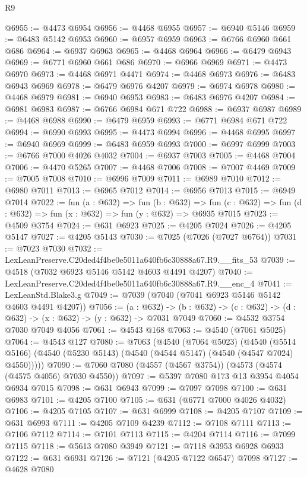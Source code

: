 \begin{lexlean}{R9}
\begin{coremodule}
@6955 := @4473 @6954
@6956 := @4468 @6955
@6957 := @6940 @5146
@6959 := @6483 @5142 @6953
@6960 := @6957 @6959
@6963 := @6766 @6960 @661 @686
@6964 := @6937 @6963
@6965 := @4468 @6964
@6966 := @6479 @6943
@6969 := @6771 @6960 @661 @686
@6970 := @6966 @6969
@6971 := @4473 @6970
@6973 := @4468 @6971 @4471
@6974 := @4468 @6973
@6976 := @6483 @6943 @6969
@6978 := @6479 @6976 @4207
@6979 := @6974 @6978
@6980 := @4468 @6979
@6981 := @6940 @6953
@6983 := @6483 @6976 @4207
@6984 := @6981 @6983
@6987 := @6766 @6984 @671 @722
@6988 := @6937 @6987
@6989 := @4468 @6988
@6990 := @6479 @6959
@6993 := @6771 @6984 @671 @722
@6994 := @6990 @6993
@6995 := @4473 @6994
@6996 := @4468 @6995
@6997 := @6940 @6969
@6999 := @6483 @6959 @6993
@7000 := @6997 @6999
@7003 := @6766 @7000 @4026 @4032
@7004 := @6937 @7003
@7005 := @4468 @7004
@7006 := @4470 @5265
@7007 := @4468 @7006
@7008 := @7007 @4469
@7009 := @7005 @7008
@7010 := @6996 @7009
@7011 := @6989 @7010
@7012 := @6980 @7011
@7013 := @6965 @7012
@7014 := @6956 @7013
@7015 := @6949 @7014
@7022 := fun (a : @632) =>
  fun (b : @632) =>
  fun (c : @632) => fun (d : @632) => fun (x : @632) => fun (y : @632) => @6935 @7015
@7023 := @4509 @3754
@7024 := @631 @6923
@7025 := @4205 @7024
@7026 := @4205 @5147
@7027 := @4205 @5143
@7030 := @7025 (@7026 (@7027 @6764))
@7031 := @7023 @7030
@7032 := LexLeanPreserve.C20ded4f4be0e5011a640fb6c30888a67.R9.__fits_53
@7039 := @4518 (@7032 @6923 @5146 @5142 @4603 @4491 @4207)
@7040 := LexLeanPreserve.C20ded4f4be0e5011a640fb6c30888a67.R9.__enc_4
@7041 := LexLeanStd.Blake3.g
@7049 := @7039 (@7040 (@7041 @6923 @5146 @5142 @4603 @4491 @4207))
@7056 := (a : @632) ->
  (b : @632) -> (c : @632) -> (d : @632) -> (x : @632) -> (y : @632) -> @7031 @7049
@7060 := @4532 @3754 @7030 @7049 @4056
@7061 := @4543 @168
@7063 := @4540 (@7061 @5025)
@7064 := @4543 @127
@7080 := @7063
    (@4540
      (@7064 @5023)
      (@4540 (@5514 @5166) (@4540 (@5230 @5143) (@4540 (@4544 @5147) (@4540 (@4547 @7024) @4550)))))
@7090 := @7060 @7080 (@4557 (@4567 @3754)) (@4573 (@4574 (@4575 @4056) @7030 @4550))
@7097 := @5397 @7080 @173 @13 @3954 @4054 @6934 @7015
@7098 := @631 @6943
@7099 := @7097 @7098
@7100 := @631 @6983
@7101 := @4205 @7100
@7105 := @631 (@6771 @7000 @4026 @4032)
@7106 := @4205 @7105
@7107 := @631 @6999
@7108 := @4205 @7107
@7109 := @631 @6993
@7111 := @4205 @7109 @4239
@7112 := @7108 @7111
@7113 := @7106 @7112
@7114 := @7101 @7113
@7115 := @4204 @7114
@7116 := @7099 @7115
@7118 := @5613 @7080 @3949
@7121 := @7118 @3953 @6928 @6933
@7122 := @631 @6931
@7126 := @7121 (@4205 @7122 @6547) @7098
@7127 := @4628 @7080

\end{coremodule}
\end{lexlean}
